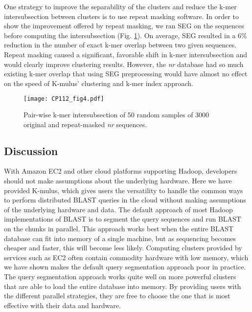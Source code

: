 One strategy to improve the separability of the clusters and reduce the k-mer intersubsection between clusters is to use repeat masking software.
In order to show the improvement offered by repeat masking, we ran SEG\cite{wootton1993statistics} on the sequences before computing the intersubsection (Fig. \ref{fig:kmer_intersubsection}). On average, SEG resulted in a 6\% reduction in the number of exact k-mer overlap between two given sequences. Repeat masking caused a significant, favorable shift in k-mer intersubsection and would clearly improve clustering results. However, the \emph{nr} database had so much existing k-mer overlap that using SEG preprocessing would have almost no effect on the speed of K-mulus' clustering and k-mer index approach.

\begin{figure}[!htb]%
\begin{center}
\texttt{[image: CP112\_fig4.pdf]}
\end{center}
\renewcommand{\baselinestretch}{1}
\small\normalsize
\begin{quote}
  \caption[Pair-wise k-mer intersubsection of 50 random samples of 3000 original and repeat-masked \emph{nr} sequences]{Pair-wise k-mer intersubsection of 50 random samples of 3000 original and repeat-masked \emph{nr} sequences.}
  \label{fig:kmer_intersubsection}
\end{quote}
\end{figure}
\renewcommand{\baselinestretch}{2}
\small\normalsize



%
\subsection{Discussion}

With Amazon EC2 and other cloud platforms supporting Hadoop, developers should not make assumptions about the underlying hardware.
Here we have provided K-mulus, which gives users the versatility to handle the common ways to perform distributed BLAST queries in the cloud without making assumptions of the underlying hardware and data.
The default approach of most Hadoop implementations of BLAST is to segment the query sequences and run BLAST on the chunks in parallel.
This approach works best when the entire BLAST database can fit into memory of a single machine, but as sequencing becomes cheaper and faster, this will become less likely.
Computing clusters provided by services such as EC2 often contain commodity hardware with low memory, which we have shown makes the default query segmentation approach poor in practice.
The query segmentation approach works quite well on more powerful clusters that are able to load the entire database into memory.
By providing users with the different parallel strategies, they are free to choose the one that is most effective with their data and hardware.

